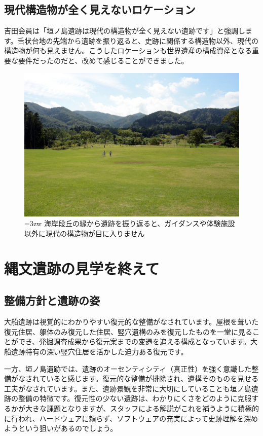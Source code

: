 \documentclass[a4j,11pt,twocolumn,openany]{jsbook}
\begin{document}
\subsection{現代構造物が全く見えないロケーション}

吉田会員は「垣ノ島遺跡は現代の構造物が全く見えない遺跡です」と強調します。舌状台地の先端から遺跡を振り返ると、史跡に関係する構造物以外、現代の構造物が何も見えません。こうしたロケーションも世界遺産の構成資産となる重要な要件だったのだと、改めて感じることができました。

\begin{figure}[ht]
	\centering
	\includegraphics[width=\linewidth]{fig/01_Iseki_kengaku/18Kakinosima_zenkei02.JPG}
	\caption{\hangindent=3zw
		海岸段丘の縁から遺跡を振り返ると、ガイダンスや体験施設以外に現代の構造物が目に入りません}
	\label{}
\end{figure}

\newpage
\section{縄文遺跡の見学を終えて}

\subsection{整備方針と遺跡の姿}
大船遺跡は視覚的にわかりやすい復元的な整備がなされています。屋根を葺いた復元住居、躯体のみ復元した住居、竪穴遺構のみを復元したものを一堂に見ることができ、発掘調査成果から復元案までの変遷を追える構成となっています。大船遺跡特有の深い竪穴住居を活かした迫力ある復元です。

一方、垣ノ島遺跡では、遺跡のオーセンティシティ（真正性）を強く意識した整備がなされていると感じます。復元的な整備が排除され、遺構そのものを見せる工夫がなされています。また、遺跡景観を非常に大切にしていることも垣ノ島遺跡の整備の特徴です。復元性の少ない遺跡は、わかりにくさをどのように克服するかが大きな課題となりますが、スタッフによる解説がこれを補うように積極的に行われ、ハードウェアに頼らず、ソフトウェアの充実によって史跡理解を深めようという狙いがあるのでしょう。
\end{document}
